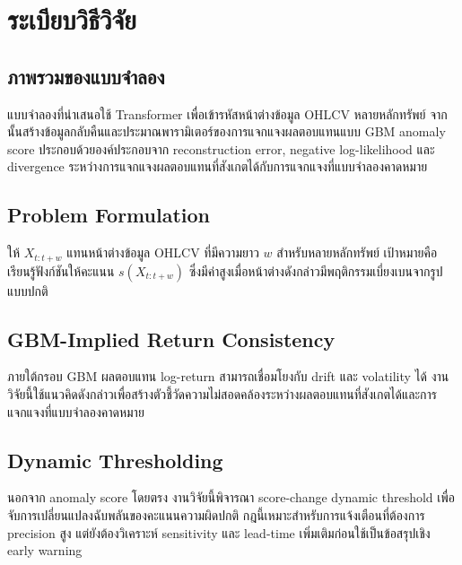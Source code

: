 \chapter{ระเบียบวิธีวิจัย}

\section{ภาพรวมของแบบจำลอง}

แบบจำลองที่นำเสนอใช้ Transformer เพื่อเข้ารหัสหน้าต่างข้อมูล OHLCV หลายหลักทรัพย์ จากนั้นสร้างข้อมูลกลับคืนและประมาณพารามิเตอร์ของการแจกแจงผลตอบแทนแบบ GBM anomaly score ประกอบด้วยองค์ประกอบจาก reconstruction error, negative log-likelihood และ divergence ระหว่างการแจกแจงผลตอบแทนที่สังเกตได้กับการแจกแจงที่แบบจำลองคาดหมาย

\section{Problem Formulation}

ให้ $X_{t:t+w}$ แทนหน้าต่างข้อมูล OHLCV ที่มีความยาว $w$ สำหรับหลายหลักทรัพย์ เป้าหมายคือเรียนรู้ฟังก์ชันให้คะแนน $s(X_{t:t+w})$ ซึ่งมีค่าสูงเมื่อหน้าต่างดังกล่าวมีพฤติกรรมเบี่ยงเบนจากรูปแบบปกติ

\section{GBM-Implied Return Consistency}

ภายใต้กรอบ GBM ผลตอบแทน log-return สามารถเชื่อมโยงกับ drift และ volatility ได้ งานวิจัยนี้ใช้แนวคิดดังกล่าวเพื่อสร้างตัวชี้วัดความไม่สอดคล้องระหว่างผลตอบแทนที่สังเกตได้และการแจกแจงที่แบบจำลองคาดหมาย

\section{Dynamic Thresholding}

นอกจาก anomaly score โดยตรง งานวิจัยนี้พิจารณา score-change dynamic threshold เพื่อจับการเปลี่ยนแปลงฉับพลันของคะแนนความผิดปกติ กฎนี้เหมาะสำหรับการแจ้งเตือนที่ต้องการ precision สูง แต่ยังต้องวิเคราะห์ sensitivity และ lead-time เพิ่มเติมก่อนใช้เป็นข้อสรุปเชิง early warning


